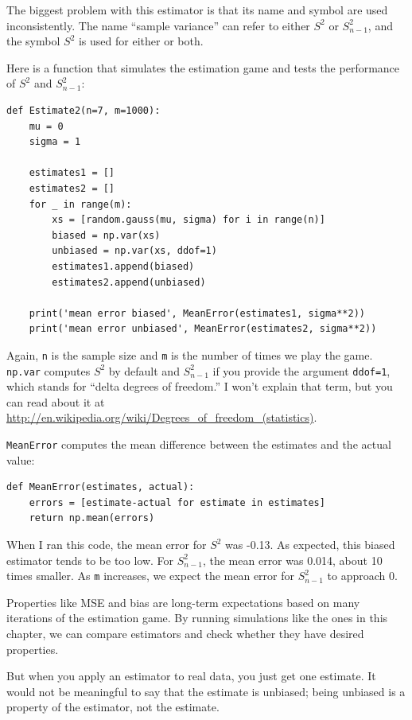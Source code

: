\documentclass[12pt]{book}
\begin{document}
The biggest problem with this estimator is that its name and symbol
are used inconsistently.  The name ``sample variance'' can refer to
either $S^2$ or $S_{n-1}^2$, and the symbol $S^2$ is used
for either or both.

Here is a function that simulates the estimation game and tests
the performance of $S^2$ and $S_{n-1}^2$:

\begin{verbatim}
def Estimate2(n=7, m=1000):
    mu = 0
    sigma = 1

    estimates1 = []
    estimates2 = []
    for _ in range(m):
        xs = [random.gauss(mu, sigma) for i in range(n)]
        biased = np.var(xs)
        unbiased = np.var(xs, ddof=1)
        estimates1.append(biased)
        estimates2.append(unbiased)

    print('mean error biased', MeanError(estimates1, sigma**2))
    print('mean error unbiased', MeanError(estimates2, sigma**2))
\end{verbatim}

Again, {\tt n} is the sample size and {\tt m} is the number of times
we play the game.  {\tt np.var} computes $S^2$ by default and
$S_{n-1}^2$ if you provide the argument {\tt ddof=1}, which stands for
``delta degrees of freedom.''  I won't explain that term, but you can read
about it at
\url{http://en.wikipedia.org/wiki/Degrees_of_freedom_(statistics)}.

{\tt MeanError} computes the mean difference between the estimates
and the actual value:

\begin{verbatim}
def MeanError(estimates, actual):
    errors = [estimate-actual for estimate in estimates]
    return np.mean(errors)
\end{verbatim}

When I ran this code, the mean error for $S^2$ was -0.13.  As
expected, this biased estimator tends to be too low.  For $S_{n-1}^2$,
the mean error was 0.014, about 10 times smaller.  As {\tt m}
increases, we expect the mean error for $S_{n-1}^2$ to approach 0.

Properties like MSE and bias are long-term expectations based on
many iterations of the estimation game.  By running simulations like
the ones in this chapter, we can compare estimators and check whether
they have desired properties.

But when you apply an estimator to real
data, you just get one estimate.  It would not be meaningful to say
that the estimate is unbiased; being unbiased is a property of the
estimator, not the estimate.
\end{document}
